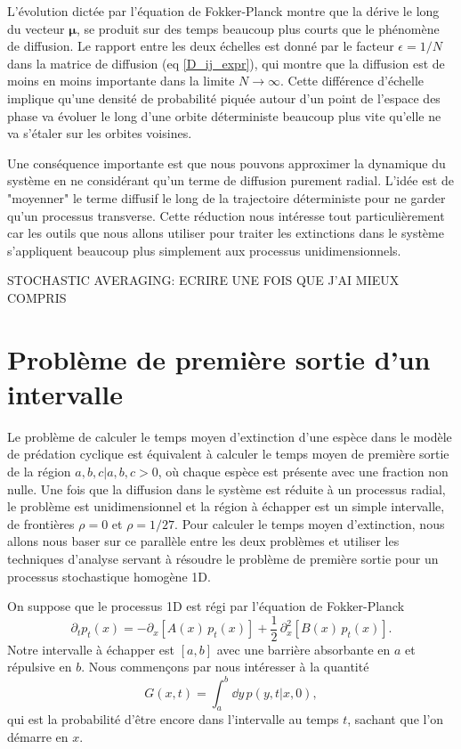 \documentclass[openany,a4paper,12pt]{article}
\begin{document}
\par L'évolution dictée par l'équation de Fokker-Planck montre que la dérive le long du vecteur $\boldsymbol \mu$, se produit sur des temps beaucoup plus courts que le phénomène de diffusion. Le rapport entre les deux échelles est donné par le facteur $\epsilon = 1/N$ dans la matrice de diffusion (eq \ref{D_ij_expr}), qui montre que la diffusion est de moins en moins importante dans la limite $N\rightarrow\infty$. Cette différence d'échelle implique qu'une densité de probabilité piquée autour d'un point de l'espace des phase va évoluer le long d'une orbite déterministe beaucoup plus vite qu'elle ne va s'étaler sur les orbites voisines.

\par Une conséquence importante est que nous pouvons approximer la dynamique du système en ne considérant qu'un terme de diffusion purement radial. L'idée est de "moyenner" le terme diffusif le long de la trajectoire déterministe pour ne garder qu'un processus transverse.
Cette réduction nous intéresse tout particulièrement car les outils que nous allons utiliser pour traiter les extinctions dans le système s'appliquent beaucoup plus simplement aux processus unidimensionnels.

{\color{red} STOCHASTIC AVERAGING: ECRIRE UNE FOIS QUE J'AI MIEUX COMPRIS}

\section{Problème de première sortie d'un intervalle}

\par Le problème de calculer le temps moyen d'extinction d'une espèce dans le modèle de prédation cyclique est équivalent à calculer le temps moyen de première sortie de la région ${a,b,c|a,b,c>0}$, où chaque espèce est présente avec une fraction non nulle. Une fois que la diffusion dans le système est réduite à un processus radial, le problème est unidimensionnel et la région à échapper est un simple intervalle, de frontières $\rho=0$ et $\rho=1/27$. Pour calculer le temps moyen d'extinction, nous allons nous baser sur ce parallèle entre les deux problèmes et utiliser les techniques d'analyse servant à résoudre le problème de première sortie pour un processus stochastique homogène 1D.

\par On suppose que le processus 1D est régi par l'équation de Fokker-Planck
%
\begin{equation}\label{echap_eq_FP}
	\partial_t p_t(x) = - \partial_x[ A(x) \, p_t(x) ] + \frac 12 \, \partial_x^2 [ B(x) \, p_t(x) ] .
\end{equation}
%
Notre intervalle à échapper est $[a,b]$ avec une barrière absorbante en $a$ et répulsive en $b$. Nous commençons par nous intéresser à la quantité 
%
\begin{equation}\label{echap_def_G}
	G(x,t) = \int_a^b \dd y \, p(y,t|x,0),
\end{equation}
%
qui est la probabilité d'être encore dans l'intervalle au temps $t$, sachant que l'on démarre en $x$.
\end{document}
